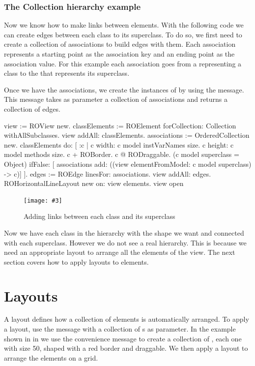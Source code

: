 \documentclass[a4paper,10pt,twoside]{book}
\newcommand{\fig}[4]{
		\begin{figure}[#1]
			\centering
			\texttt{[image: \#3]}
			\caption{\label{fig:#3}#4}
		\end{figure}}
\begin{document}
\subsubsection{The Collection hierarchy example}
Now we know how to make links between elements. With the following code we can create edges between each class to its superclass. 
To do so, we first need to create a collection of associations to build edges with them. Each association represents a starting point as the association key and an ending point as the association value. For this example each association goes from a  representing a class to the  that represents its superclass. 

Once we have the associations, we create the instances of  by using the  message. This message takes as parameter a collection of associations and returns a collection of edges.


\begin{code}{}
view := ROView new.
classElements := ROElement forCollection: Collection withAllSubclasses.
view addAll: classElements.
associations := OrderedCollection new.
classElements do: [ :c | 
	c width: c model instVarNames size.
	c height: c model methods size.
	c + ROBorder. 
	c @ RODraggable.	
	(c model superclass = Object)
		ifFalse: [ associations add: ((view elementFromModel: c model superclass) -> c)]	
	 ].
edges := ROEdge linesFor: associations.
view addAll: edges.
ROHorizontalLineLayout new on: view elements.
view open
\end{code}

\fig{H}{0.6}{hier3}{Adding links between each class and its superclass}

Now we have each class in the  hierarchy with the shape we want and connected with each superclass. However we do not see a real hierarchy. This is because we need an appropriate layout to arrange all the elements of the view. The next section covers how to apply layouts to elements.


\section{Layouts} 
A layout defines how a collection of elements is automatically arranged. To apply a layout, use the  message with a collection of s as parameter. In the example shown in in  we use the  convenience message to create a collection of , each one with size 50, shaped with a red border and draggable. We then apply a layout to arrange the elements on a grid.
\end{document}
